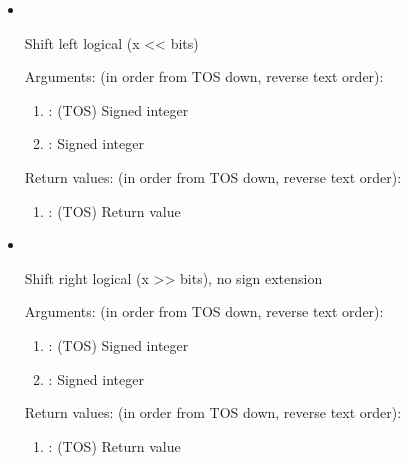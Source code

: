 \begin{itemize}
\item {}\ 

\noindent Shift left logical (x << bits)

\noindent Arguments: (in order from TOS down, reverse text order):
\begin{enumerate}
\item {}: (TOS) Signed integer
\item {}: Signed integer
\end{enumerate}

\noindent Return values: (in order from TOS down, reverse text order):
\begin{enumerate}
\item {}: (TOS) Return value
\end{enumerate}

\item {}\ 

\noindent Shift right logical (x >> bits), no sign extension

\noindent Arguments: (in order from TOS down, reverse text order):
\begin{enumerate}
\item {}: (TOS) Signed integer
\item {}: Signed integer
\end{enumerate}

\noindent Return values: (in order from TOS down, reverse text order):
\begin{enumerate}
\item {}: (TOS) Return value
\end{enumerate}

\end{itemize}


